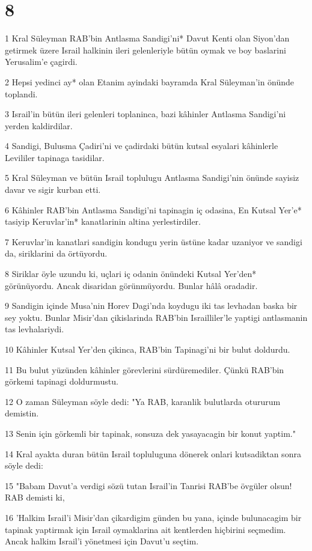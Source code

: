 \chapter{8}

\par 1 Kral Süleyman RAB'bin Antlasma Sandigi'ni* Davut Kenti olan Siyon'dan getirmek üzere Israil halkinin ileri gelenleriyle bütün oymak ve boy baslarini Yerusalim'e çagirdi.
\par 2 Hepsi yedinci ay* olan Etanim ayindaki bayramda Kral Süleyman'in önünde toplandi.
\par 3 Israil'in bütün ileri gelenleri toplaninca, bazi kâhinler Antlasma Sandigi'ni yerden kaldirdilar.
\par 4 Sandigi, Bulusma Çadiri'ni ve çadirdaki bütün kutsal esyalari kâhinlerle Levililer tapinaga tasidilar.
\par 5 Kral Süleyman ve bütün Israil toplulugu Antlasma Sandigi'nin önünde sayisiz davar ve sigir kurban etti.
\par 6 Kâhinler RAB'bin Antlasma Sandigi'ni tapinagin iç odasina, En Kutsal Yer'e* tasiyip Keruvlar'in* kanatlarinin altina yerlestirdiler.
\par 7 Keruvlar'in kanatlari sandigin kondugu yerin üstüne kadar uzaniyor ve sandigi da, siriklarini da örtüyordu.
\par 8 Siriklar öyle uzundu ki, uçlari iç odanin önündeki Kutsal Yer'den* görünüyordu. Ancak disaridan görünmüyordu. Bunlar hâlâ oradadir.
\par 9 Sandigin içinde Musa'nin Horev Dagi'nda koydugu iki tas levhadan baska bir sey yoktu. Bunlar Misir'dan çikislarinda RAB'bin Israilliler'le yaptigi antlasmanin tas levhalariydi.
\par 10 Kâhinler Kutsal Yer'den çikinca, RAB'bin Tapinagi'ni bir bulut doldurdu.
\par 11 Bu bulut yüzünden kâhinler görevlerini sürdüremediler. Çünkü RAB'bin görkemi tapinagi doldurmustu.
\par 12 O zaman Süleyman söyle dedi: "Ya RAB, karanlik bulutlarda otururum demistin.
\par 13 Senin için görkemli bir tapinak, sonsuza dek yasayacagin bir konut yaptim."
\par 14 Kral ayakta duran bütün Israil topluluguna dönerek onlari kutsadiktan sonra söyle dedi:
\par 15 "Babam Davut'a verdigi sözü tutan Israil'in Tanrisi RAB'be övgüler olsun! RAB demisti ki,
\par 16 'Halkim Israil'i Misir'dan çikardigim günden bu yana, içinde bulunacagim bir tapinak yaptirmak için Israil oymaklarina ait kentlerden hiçbirini seçmedim. Ancak halkim Israil'i yönetmesi için Davut'u seçtim.
